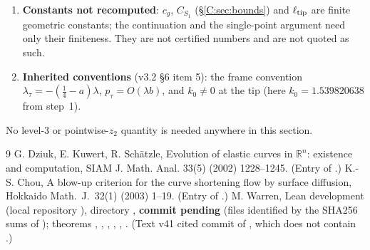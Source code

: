 \documentclass[11pt]{article}
\begin{document}
\begin{enumerate}[leftmargin=*]
\item \textbf{Constants not recomputed}: $c_g$, $C_{S_1}$ (\S\ref{C:sec:bounds}) and $\ell_{\rm tip}$ are finite geometric constants; the continuation and the single-point argument need only their finiteness. They are not certified numbers and are not quoted as such.
\item \textbf{Inherited conventions} (v3.2 \S6 item 5): the frame convention $\lambda_\tau=-(\frac14-a)\lambda$, $p_\tau=O(\lambda b)$, and $k_0\ne0$ at the tip (here $k_0=1.539820638$ from step~1).
\end{enumerate}
No level-3 or pointwise-$z_2$ quantity is needed anywhere in this section.

\ifdefined\stepmain\else
\begin{thebibliography}{9}
 G. Dziuk, E. Kuwert, R. Sch\"atzle, Evolution of elastic curves in $\mathbb R^n$: existence and computation, SIAM J. Math. Anal. 33(5) (2002) 1228--1245. (Entry  of .)
 K.-S. Chou, A blow-up criterion for the curve shortening flow by surface diffusion, Hokkaido Math.\ J.\ 32(1) (2003) 1--19. (Entry  of .)
 M. Warren, Lean development  (local repository ), directory , \textbf{commit pending} (files identified by the SHA256 sums of ); theorems , , , , , . (Text v41 cited commit  of , which does not contain .)
\end{thebibliography}
\end{document}
